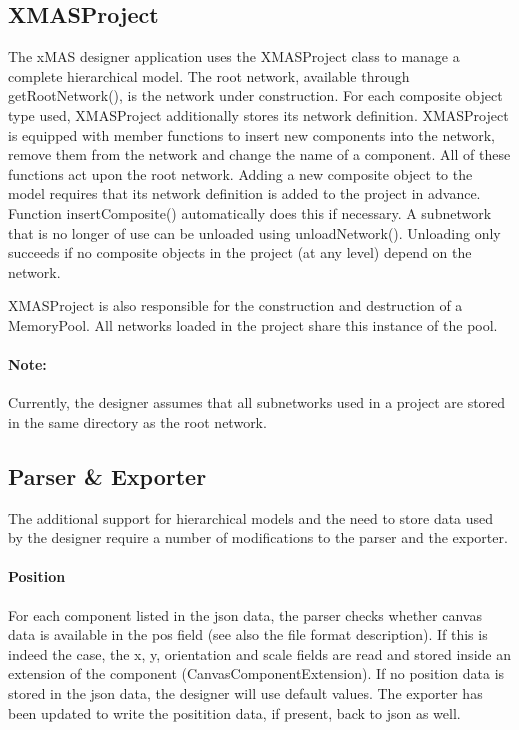 \subsection{XMASProject}

The xMAS designer application uses the XMASProject class to manage a complete
hierarchical model. The root network, available through getRootNetwork(), is
the network under construction. For each composite object type used, XMASProject
additionally stores its network definition. XMASProject is equipped with member
functions to insert new components into the network, remove them from the network
and change the name of a component. All of these functions act upon the root network.
Adding a new composite object to the model requires that its network definition
is added to the project in advance. Function insertComposite() automatically does
this if necessary. A subnetwork that is no longer of use can be unloaded using
unloadNetwork(). Unloading only succeeds if no composite objects in the project
(at any level) depend on the network.

XMASProject is also responsible for the construction and destruction of a MemoryPool.
All networks loaded in the project share this instance of the pool.

\paragraph{Note:}
Currently, the designer assumes that all subnetworks used in a project are
stored in the same directory as the root network.


\subsection{Parser \& Exporter}

The additional support for hierarchical models and the need to store data used
by the designer require a number of modifications to the parser and the exporter.

\paragraph{Position}
For each component listed in the json data, the parser checks whether canvas data
is available in the pos field (see also the file format description). If this is
indeed the case, the x, y, orientation and scale fields are read and stored inside
an extension of the component (CanvasComponentExtension). If no position data
is stored in the json data, the designer will use default values. The exporter has
been updated to write the positition data, if present, back to json as well.

